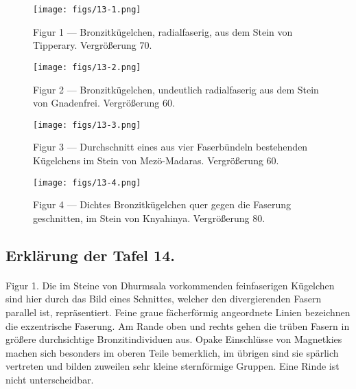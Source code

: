 \documentclass[a4paper, 11pt, oneside, polutonikogreek, german]{article}
\begin{document}
\vspace*{\fill}
\begin{figure}[H]
\centering
\texttt{[image: figs/13-1.png]}
\caption{\small Figur 1 --- Bronzitkügelchen, radialfaserig, aus dem Stein von Tipperary. Vergrößerung 70.}
\end{figure}
\vspace*{\fill}
\clearpage

\vspace*{\fill}
\begin{figure}[H]
\centering
\texttt{[image: figs/13-2.png]}
\caption{\small Figur 2 --- Bronzitkügelchen, undeutlich radialfaserig aus dem Stein von Gnadenfrei. Vergrößerung 60.}
\end{figure}
\vspace*{\fill}
\clearpage

\vspace*{\fill}
\begin{figure}[H]
\centering
\texttt{[image: figs/13-3.png]}
\caption{\small Figur 3 --- Durchschnitt eines aus vier Faserbündeln bestehenden Kügelchens im Stein von Mezö-Madaras. Vergrößerung 60.}
\end{figure}
\vspace*{\fill}
\clearpage

\vspace*{\fill}
\begin{figure}[H]
\centering
\texttt{[image: figs/13-4.png]}
\caption{\small Figur 4 --- Dichtes Bronzitkügelchen quer gegen die Faserung geschnitten, im Stein von Knyahinya. Vergrößerung 80.}
\end{figure}
\vspace*{\fill}
\clearpage

\subsection{Erklärung der Tafel 14.}
\paragraph{}
Figur 1. Die im Steine von Dhurmsala vorkommenden feinfaserigen Kügelchen sind hier durch das Bild eines Schnittes, welcher den divergierenden Fasern parallel ist, repräsentiert. Feine graue fächerförmig angeordnete Linien bezeichnen die exzentrische Faserung. Am Rande oben und rechts gehen die trüben Fasern in größere durchsichtige Bronzitindividuen aus. Opake Einschlüsse von Magnetkies machen sich besonders im oberen Teile bemerklich, im übrigen sind sie spärlich vertreten und bilden zuweilen sehr kleine sternförmige Gruppen. Eine Rinde ist nicht unterscheidbar.
\end{document}
